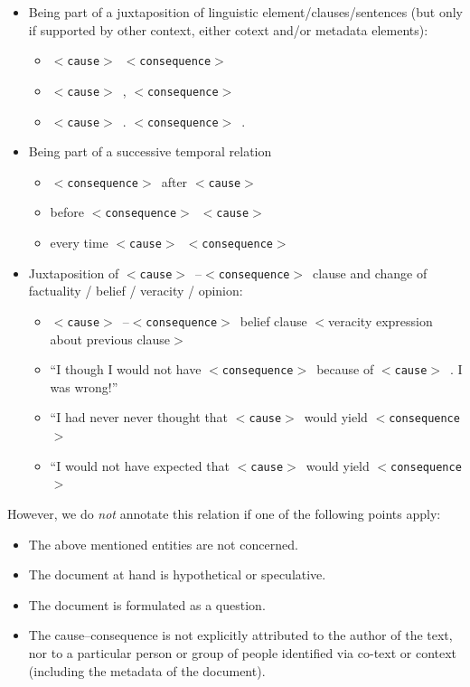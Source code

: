 \documentclass[12pt]{article}
\theoremstyle{definition}
\newcommand{\cause}{$<$\texttt{cause}$>$\ }
\newcommand{\conseq}{$<$\texttt{consequence}$>$\ }
\begin{document}
\begin{itemize}
    \item Being part of a juxtaposition of linguistic element/clauses/sentences (but only if supported by other context, either cotext and/or metadata elements):
    \begin{itemize}
        \item \cause \conseq
        \item \cause, \conseq
        \item \cause. \conseq.
    \end{itemize}
    \item Being part of a successive temporal relation
    \begin{itemize}
        \item \conseq after \cause
        \item before \conseq \cause
        \item every time \cause \conseq
    \end{itemize}
    \item Juxtaposition of \cause--\conseq clause and change of factuality / belief / veracity / opinion:
    \begin{itemize}
        \item \cause--\conseq belief clause  $<$veracity expression about previous clause$>$
        \item ``I though I would not have \conseq because of \cause. I was wrong!''
        \item ``I had never never thought that \cause would yield \conseq
        \item ``I would not have expected that \cause would yield \conseq
    \end{itemize}


 
\end{itemize}


However, we do \emph{not} annotate this relation if one of the following points apply:

\begin{itemize}
    \item The above mentioned entities are not concerned.
    \item The document at hand is hypothetical or speculative.
    \item The document is formulated as a question.
    \item The cause--consequence is not explicitly attributed to the author of the text, nor to a particular person or group of people identified via co-text or context (including the metadata of the document).
\end{itemize}
\end{document}
